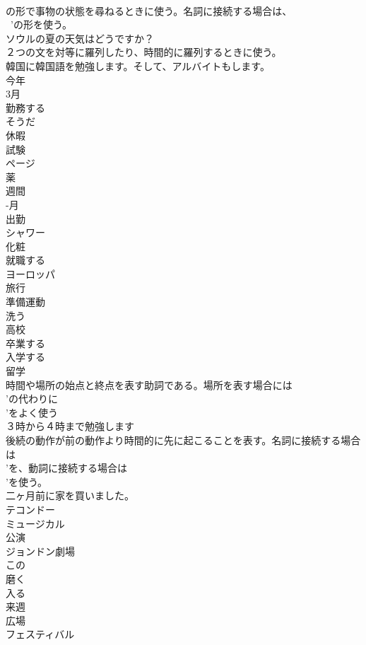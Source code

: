 \documentclass[8pt]{extreport}
\begin{document}
\begin{CJK}{UTF8}{min}
\\	の形で事物の状態を尋ねるときに使う。名詞に接続する場合は、
\\	~'の形を使う。	
\\	ソウルの夏の天気はどうですか？
\\	２つの文を対等に羅列したり、時間的に羅列するときに使う。	
\\	韓国に韓国語を勉強します。そして、アルバイトもします。
\\	今年
\\	3月
\\	勤務する
\\	そうだ
\\	休暇
\\	試験
\\	ページ
\\	薬
\\	週間
\\	-月
\\	出勤
\\	シャワー
\\	化粧
\\	就職する
\\	ヨーロッパ
\\	旅行
\\	準備運動
\\	洗う
\\	高校
\\	卒業する
\\	入学する
\\	留学
\\	時間や場所の始点と終点を表す助詞である。場所を表す場合には
\\	'の代わりに
\\	'をよく使う	
\\	３時から４時まで勉強します
\\	後続の動作が前の動作より時間的に先に起こることを表す。名詞に接続する場合は
\\	'を、動詞に接続する場合は
\\	'を使う。	
\\	二ヶ月前に家を買いました。
\\	テコンドー
\\	ミュージカル
\\	公演
\\	ジョンドン劇場
\\	この
\\	磨く
\\	入る
\\	来週
\\	広場
\\	フェスティバル

\end{CJK}
\end{document}
